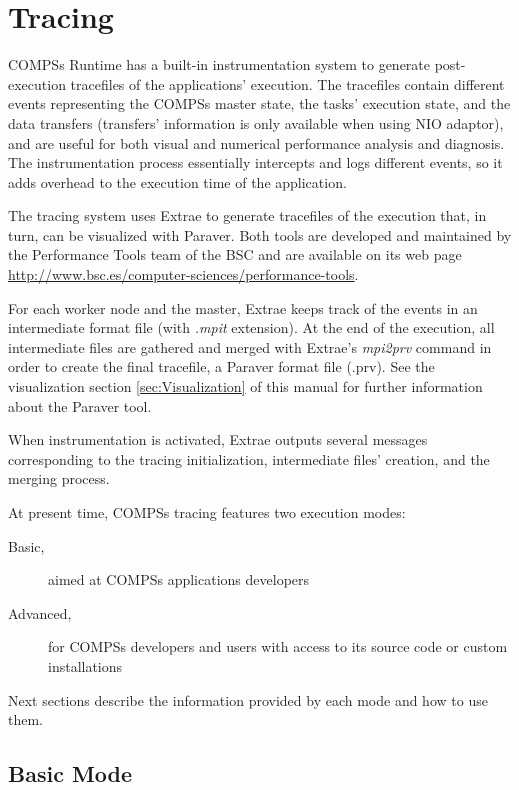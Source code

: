 \section{Tracing}
\label{sec:tracing}

COMPSs Runtime has a built-in instrumentation system to generate post-execution tracefiles of the applications' execution. The tracefiles contain different events representing the COMPSs master state, the tasks' execution state, and the data transfers (transfers' information is only available when using NIO adaptor), and are useful for both visual and numerical performance analysis and diagnosis. The instrumentation process essentially intercepts and logs different events, so it adds overhead to the execution time of the application.


The tracing system uses Extrae to generate tracefiles of the execution that, in turn, can be visualized with Paraver. Both tools are developed and maintained by the Performance Tools team of the BSC and are available on its web page 
\url{http://www.bsc.es/computer-sciences/performance-tools}. 


For each worker node and the master, Extrae keeps track of the events in an intermediate format file (with \textit{.mpit} extension). At the end of the execution, all intermediate files are gathered and merged with Extrae's \textit{mpi2prv} command in order to create the final tracefile, a Paraver format file (.prv). See the visualization section \ref{sec:Visualization} of this manual for further information about the Paraver tool.


When instrumentation is activated, Extrae outputs several messages corresponding to the tracing initialization, intermediate files' creation, and
the merging process. 


At present time, COMPSs tracing features two execution modes:


\begin{description}
\item [Basic,] aimed at COMPSs applications developers
\item [Advanced,] for COMPSs developers and users with access to its source code or custom installations
\end{description}


Next sections describe the information provided by each mode and how to use them.


\subsection{Basic Mode}

